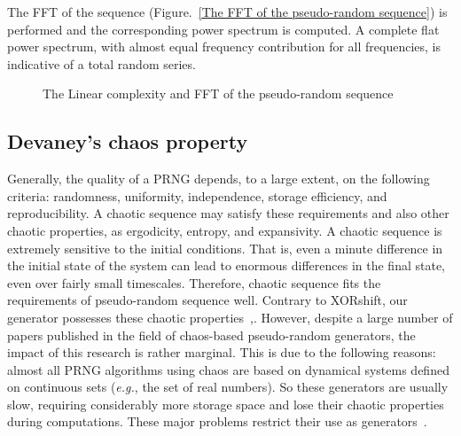 The FFT of the sequence (Figure.~\ref{The FFT of the pseudo-random sequence}) is performed and the corresponding power spectrum is computed. A complete flat power spectrum, with almost equal frequency contribution for all frequencies, is indicative of a total random series.


\begin{figure}[h!] 
\centering
{}
\caption{The Linear complexity and FFT of the pseudo-random sequence}
\label{The Linear complexity and FFT of the pseudo-random sequence}
\end{figure}

\subsection{Devaney's chaos property}

Generally, the quality of a PRNG depends, to a large extent, on the following criteria: randomness, uniformity, independence, storage efficiency, and reproducibility. A chaotic sequence may satisfy these requirements and also other chaotic properties, as ergodicity, entropy, and expansivity. A chaotic sequence is extremely sensitive to the initial conditions. That is, even a minute difference in the initial state of the system can lead to enormous differences in the final state, even over fairly small timescales. Therefore, chaotic sequence fits the requirements of pseudo-random sequence well. Contrary to XORshift, our generator possesses these chaotic properties~\cite{guyeux10},\cite{wang2009}.
However, despite a large number of papers published in the field of chaos-based pseudo-random generators, the impact of this research is rather marginal. This is due to the following reasons: almost all PRNG algorithms using chaos are based on dynamical systems defined on continuous sets (\emph{e.g.}, the set of real numbers). So these generators are usually slow, requiring considerably more storage space and lose their chaotic properties during computations. These major problems restrict their use as generators~\cite{Kocarev2001}.

